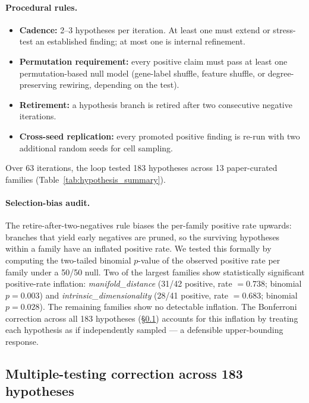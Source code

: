 \documentclass[12pt]{article}
\begin{document}
\paragraph{Procedural rules.}
\begin{itemize}
\item \textbf{Cadence:} 2--3 hypotheses per iteration. At least one must extend or stress-test an established finding; at most one is internal refinement.
\item \textbf{Permutation requirement:} every positive claim must pass at least one permutation-based null model (gene-label shuffle, feature shuffle, or degree-preserving rewiring, depending on the test).
\item \textbf{Retirement:} a hypothesis branch is retired after two consecutive negative iterations.
\item \textbf{Cross-seed replication:} every promoted positive finding is re-run with two additional random seeds for cell sampling.
\end{itemize}
Over 63 iterations, the loop tested 183 hypotheses across 13 paper-curated families (Table~\ref{tab:hypothesis_summary}).

\paragraph{Selection-bias audit.}
The retire-after-two-negatives rule biases the per-family positive rate upwards: branches that yield early negatives are pruned, so the surviving hypotheses within a family have an inflated positive rate.
We tested this formally by computing the two-tailed binomial $p$-value of the observed positive rate per family under a 50/50 null.
Two of the largest families show statistically significant positive-rate inflation: \emph{manifold\_distance} (31/42 positive, rate $= 0.738$; binomial $p = 0.003$) and \emph{intrinsic\_dimensionality} (28/41 positive, rate $= 0.683$; binomial $p = 0.028$).
The remaining families show no detectable inflation.
The Bonferroni correction across all 183 hypotheses (§\ref{sec:methods_multiple_testing}) accounts for this inflation by treating each hypothesis as if independently sampled --- a defensible upper-bounding response.

\subsection{Multiple-testing correction across 183 hypotheses}
\label{sec:methods_multiple_testing}
\end{document}

